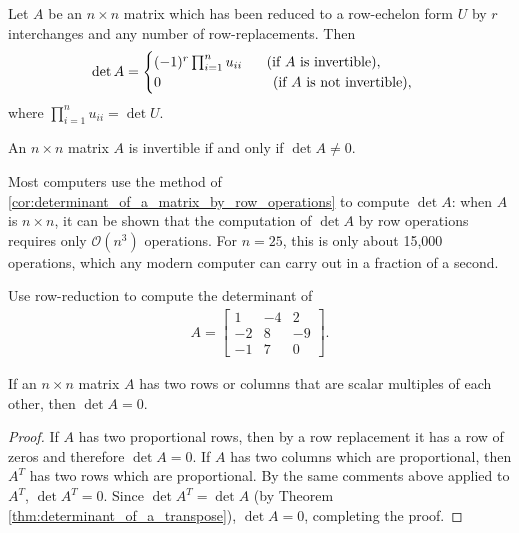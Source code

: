 \documentclass[12pt,letterpaper,reqno]{article}
\numberwithin{equation}{section}
\newcommand{\fixme}[1]{{\color{orange}{[#1]}}}
\begin{document}
\begin{cor}\label{cor:determinant_of_a_matrix_by_row_operations}
	Let $A$ be an $n \times n$ matrix which has been reduced to a row-echelon form $U$ by $r$ interchanges and any number of row-replacements. Then 
	\begin{align*}
		\det A=\begin{cases}
			(-1)^r\prod_{i=1}^nu_{ii} \hspace{0.5cm}\text{ (if $A$ is invertible)}, \\
			0 \hspace{2.7cm} \text{ (if $A$ is not invertible)},
		\end{cases}
	\end{align*}
	where $\prod_{i=1}^nu_{ii}=\det U$.
\end{cor}

\fixme{Need to prove that, while $U$ is not unique, $\det U$ is. Or is this obvious?}

\begin{cor}
	An $n \times n$ matrix $A$ is invertible if and only if $\det A \neq 0$.
\end{cor}

Most computers use the method of \ref{cor:determinant_of_a_matrix_by_row_operations} to compute $\det A$: when $A$ is $n \times n$, it can be shown that the computation of $\det A$ by row operations requires only $\mathcal{O}(n^3)$ operations. For $n=25$, this is only about 15,000 operations, which any modern computer can carry out in a fraction of a second.

\begin{exercise}
Use row-reduction to compute the determinant of 
\begin{align*}
	A=\begin{bmatrix}
		1 & -4 & 2 \\
		-2 & 8 & -9 \\
		-1 & 7 & 0
	\end{bmatrix}.
\end{align*}	
\end{exercise}

\begin{prop}
	If an $n \times n$ matrix $A$ has two rows or columns that are scalar multiples of each other, then $\det A=0$.
\end{prop}

\begin{proof}
	If $A$ has two proportional rows, then by a row replacement it has a row of zeros and therefore $\det A=0$. If $A$ has two columns which are proportional, then $A^T$ has two rows which are proportional. By the same comments above applied to $A^T$, $\det A^T=0$. Since $\det A^T=\det A$ (by Theorem \ref{thm:determinant_of_a_transpose}), $\det A=0$, completing the proof. 
\end{proof}
\end{document}
